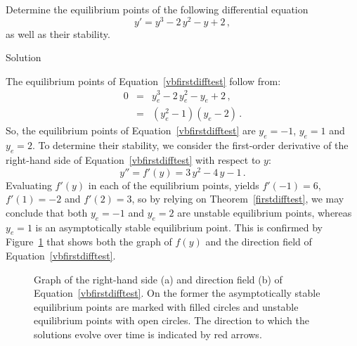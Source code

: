 \newpage

\begin{example}
Determine the equilibrium points of the following differential equation
\begin{equation}
y'=y^3-2\,y^2-y+2\,,
\label{vbfirstdifftest}
\end{equation}
as well as their stability. 

Solution 

The equilibrium points of Equation~\eqref{vbfirstdifftest} follow from:
\begin{eqnarray*}
0&=&y_e^3-2\,y_e^2-y_e+2\,,\\
&=&\left(y_e^2-1\right)\left(y_e-2\right)\,.
\end{eqnarray*}
So, the equilibrium points of Equation~\eqref{vbfirstdifftest} are $y_e=-1$, $y_e=1$ and $y_e=2$. To determine their stability, we consider the first-order derivative of the right-hand side of Equation~\eqref{vbfirstdifftest} with respect to $y$:
$$
y''=f'(y)=3\,y^2-4\,y-1\,.
$$
Evaluating $f'(y)$ in each of the equilibrium points, yields $f'(-1)=6$, $f'(1)=-2$ and $f'(2)=3$, so by relying on Theorem~\ref{firstdifftest}, we may conclude that both $y_e=-1$ and $y_e=2$ are unstable equilibrium points, whereas $y_e=1$ is an asymptotically stable equilibrium point. This is confirmed by Figure~\ref{vbfigfirstdifftest} that shows both the graph of $f(y)$ and the direction field of Equation~\eqref{vbfirstdifftest}.

\begin{figure}[H]
\centering
\centerline{
\hspace{0.1cm}
}
\caption{Graph of the right-hand side (a) and direction field (b) of Equation~\eqref{vbfirstdifftest}. On the former the asymptotically stable equilibrium points are marked with filled circles and unstable equilibrium points with open circles. The direction to which the solutions evolve over time is indicated by red arrows. } 
\label{vbfigfirstdifftest}
\end{figure}

\end{example}


